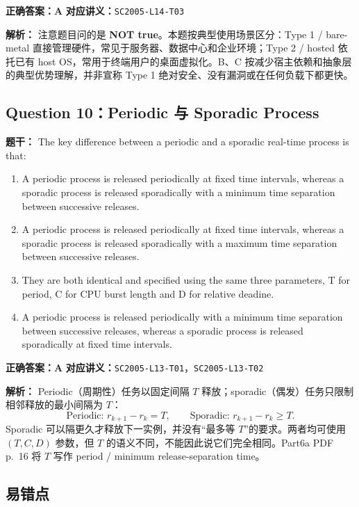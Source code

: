 \documentclass[11pt,a4paper,fontset=fandol]{ctexart}
\renewcommand{\exercisequestion}[2]{%
  \Needspace{5\baselineskip}%
  \subsection{#2}\label{exercise:#1}%
}
\renewenvironment{checkedsolution}
  {\par\nopagebreak[4]\textbf{解析：}\ignorespaces}
  {\par}
\begin{document}
\textbf{正确答案：A}\qquad
\textbf{对应讲义：}\texttt{SC2005-L14-T03}

\begin{checkedsolution}
注意题目问的是 \textbf{NOT true}。本题按典型使用场景区分：Type 1 / bare-metal 直接管理硬件，常见于服务器、数据中心和企业环境；Type 2 / hosted 依托已有 host OS，常用于终端用户的桌面虚拟化。B、C 按减少宿主依赖和抽象层的典型优势理解，并非宣称 Type 1 绝对安全、没有漏洞或在任何负载下都更快。
\end{checkedsolution}

\exercisequestion{SC2005-HW04-Q10}{Question 10：Periodic 与 Sporadic Process}

\textbf{题干：} The key difference between a periodic and a sporadic real-time process is that:

\begin{enumerate}[label=\Alph*.,leftmargin=2.4em]
  \item A periodic process is released periodically at fixed time intervals, whereas a sporadic process is released sporadically with a minimum time separation between successive releases.
  \item A periodic process is released periodically at fixed time intervals, whereas a sporadic process is released sporadically with a maximum time separation between successive releases.
  \item They are both identical and specified using the same three parameters, T for period, C for CPU burst length and D for relative deadine.
  \item A periodic process is released periodically with a minimum time separation between successive releases, whereas a sporadic process is released sporadically at fixed time intervals.
\end{enumerate}

\textbf{正确答案：A}\qquad
\textbf{对应讲义：}\texttt{SC2005-L13-T01}，\texttt{SC2005-L13-T02}

\begin{checkedsolution}
Periodic（周期性）任务以固定间隔 $T$ 释放；sporadic（偶发）任务只限制相邻释放的最小间隔为 $T$：
\[
  \text{Periodic: }r_{k+1}-r_k=T,
  \qquad
  \text{Sporadic: }r_{k+1}-r_k\ge T.
\]
Sporadic 可以隔更久才释放下一实例，并没有“最多等 $T$”的要求。两者均可使用 $(T,C,D)$ 参数，但 $T$ 的语义不同，不能因此说它们完全相同。Part6a PDF p.~16 将 $T$ 写作 period / minimum release-separation time。
\end{checkedsolution}

\subsection{易错点}
\end{document}
